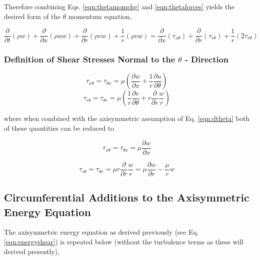 	Therefore combining Eqs. \ref{eqn:thetamomchg} and \ref{eqn:thetaforces} yields the desired form of the 
$\theta$ momentum equation,

\begin{equation}
\frac{\partial}{\partial t}(\rho w) + \frac{\partial}{\partial x}(\rho uw) +
\frac{\partial}{\partial r}(\rho vw) + \frac{1}{r}(\rho vw) = 
\frac{\partial}{\partial x}(\tau_{x\theta}) + \frac{\partial}{\partial r}(\tau_{r\theta}) + 
\frac{1}{r}(2\tau_{r\theta})
\label{eqn:thetamom}
\end{equation}

\subsubsection{Definition of Shear Stresses Normal to the $\theta$ - Direction}
 
\begin{displaymath}
	\tau_{x\theta} = \tau_{\theta x} = \mu(\frac{\partial w}{\partial x} + \frac{1}{r}\frac{\partial u}{\partial \theta})
\end{displaymath}
\begin{displaymath}
	\tau_{r\theta} = \tau_{\theta r} = \mu(\frac{1}{r}\frac{\partial v}{\partial \theta} + r\frac{\partial}{\partial r}
	\frac{w}{r})
\end{displaymath}

	where when combined with the axisymmetric assumption of Eq. \ref{eqn:dtheta} both of these quantities can be
reduced to

\begin{equation}
	\tau_{x\theta} = \tau_{\theta x} = \mu\frac{\partial w}{\partial x}	
\label{eqn:tauxtheta}
\end{equation}

\begin{equation}
	\tau_{r\theta} = \tau_{\theta r} = \mu r\frac{\partial}{\partial r}\frac{w}{r} = 
	\mu \frac{\partial w}{\partial r} - \frac{\mu}{r}w	
\label{eqn:taurtheta}
\end{equation}

\subsection{Circumferential Additions to the Axisymmetric Energy Equation}

	The axisymmetric energy equation as derived previously (see Eq. \ref{eqn:energyshear}) is repeated below
(without the turbulence terms as these will derived presently),

